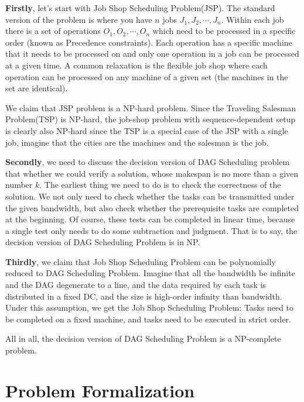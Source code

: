 \documentclass{llncs}
\begin{document}
\textbf{Firstly}, let's start with Job Shop Scheduling Problem(JSP). The standard version of the problem is where you have $n$ jobs $J_1, J_2, \cdots, J_n$. Within each job there is a set of operations $O_1, O_2, \cdots, O_n$ which need to be processed in a specific order (known as Precedence constraints). Each operation has a specific machine that it needs to be processed on and only one operation in a job can be processed at a given time. A common relaxation is the flexible job shop where each operation can be processed on any machine of a given set (the machines in the set are identical).

We claim that JSP problem is a NP-hard problem. Since the Traveling Salesman Problem(TSP)\cite{ref_10} is NP-hard, the job-shop problem with sequence-dependent setup is clearly also NP-hard since the TSP is a special case of the JSP with a single job, imagine that the cities are the machines and the salesman is the job.

\textbf{Secondly}, we need to discuss the decision version of DAG Scheduling problem that whether we could verify a solution, whose makespan is no more than a given number $k$. The earliest thing we need to do is to check the correctness of the solution. We not only need to check whether the tasks can be transmitted under the given bandwidth, but also check whether the prerequisite tasks are completed at the beginning. Of course, these tests can be completed in linear time, because a single test only needs to do some subtraction and judgment. That is to say, the decision version of DAG Scheduling Problem is in NP.

\textbf{Thirdly}, we claim that Job Shop Scheduling Problem can be polynomially reduced to DAG Scheduling Problem. Imagine that all the bandwidth be infinite and the DAG degenerate to a line, and the data required by each task is distributed in a fixed DC, and the size is high-order infinity than bandwidth. Under this assumption, we get the Job Shop Scheduling Problem: Tasks need to be completed on a fixed machine, and tasks need to be executed in strict order.

All in all, the decision version of DAG Scheduling Problem is a NP-complete problem.

\section{Problem Formalization}
\end{document}

